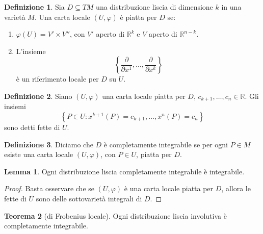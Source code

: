 \documentclass[a4paper,11pt]{article}
\theoremstyle{definition}
\newtheorem{definizione}{Definizione}[section]
\theoremstyle{theorem}
\newtheorem{teorema}{Teorema}[section]
\newtheorem{lemma}[teorema]{Lemma}
\newcommand{\R}{\mathbb{R}}
\begin{document}
\begin{definizione}
	Sia $D\subseteq TM$ una distribuzione liscia di dimensione $k$ in una varietà $M$. Una carta locale $(U,\varphi)$ è piatta per $D$ se:
	\begin{enumerate}
		\item $\varphi(U)=V'\times V''$, con $V'$ aperto di $\R^k$ e $V$ aperto di $\R^{n-k}$.
		\item L'insieme\[\left\{\frac{\partial}{\partial x^1},\dots,\frac{\partial}{\partial x^k}\right\}\]
		è un riferimento locale per $D$ su $U$.
	\end{enumerate}
\end{definizione}
\begin{definizione}
	Siano $(U,\varphi)$ una carta locale piatta per $D$, $c_{k+1},\dots,c_n\in\R$. Gli insiemi
	\[\left\{P\in U:x^{k+1}(P)=c_{k+1},\dots,x^n(P)=c_n\right\}\]
	sono detti fette di $U$.
\end{definizione}
\begin{definizione}
	Diciamo che $D$ è completamente integrabile se per ogni $P\in M$ esiste una carta locale $(U,\varphi)$, con $P\in U$, piatta per $D$.
\end{definizione}
\begin{lemma}
	Ogni distribuzione liscia completamente integrabile è integrabile.
\end{lemma}
\begin{proof}
	Basta osservare che se $(U,\varphi)$ è una carta locale piatta per $D$, allora le fette di $U$ sono delle sottovarietà integrali di $D$.
\end{proof}
\begin{teorema}[di Frobenius locale]
	Ogni distribuzione liscia involutiva è completamente integrabile.
\end{teorema}
\end{document}
